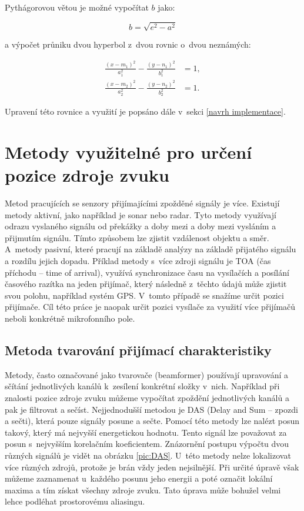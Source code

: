 Pythágorovou větou je možné vypočítat $b$ jako: 

\begin{equation}
    b = \sqrt{e^2 - a^2}
    \label{eq:vedlejsipoloosa}
\end{equation}

 a výpočet průniku dvou hyperbol z~dvou rovnic o~dvou neznámých:

\begin{align}
    \label{eq:prusecik}
    \frac{(x-m_{1})^2}{a_{1}^2}-\frac{(y-n_{1})^2}{b_{1}^2}&=1, \\
    \frac{(x-m_{2})^2}{a_{2}^2}-\frac{(y-n_{2})^2}{b_{2}^2}&=1.
\end{align}

Upravení této rovnice a využití je popsáno dále v~sekci \ref{navrh implementace}.

\chapter{Metody využitelné pro určení pozice zdroje zvuku}
\label{metody}

Metod pracujících se senzory přijímajícími zpožděné signály je více. Existují metody aktivní, jako například je sonar nebo radar. Tyto metody využívají odrazu vyslaného signálu od překážky a doby mezi a doby mezi vysláním a přijmutím signálu. Tímto způsobem lze zjistit vzdálenost objektu a směr. A~metody pasivní, které pracují na základě analýzy na základě přijatého signálu a rozdílu jejich dopadu. Příklad metody s~více zdroji signálu je TOA (čas příchodu – time of arrival), využívá synchronizace času na vysílačích a posílání časového razítka na jeden přijímač, který následně z~těchto údajů může zjistit svou polohu, například systém GPS. V~tomto případě se snažíme určit pozici přijímače. Cíl této práce je naopak určit pozici vysílače za využití více přijímačů neboli konkrétně mikrofonního pole.

\section{Metoda tvarování přijímací charakteristiky}
\label{beamforming}

Metody, často označované jako tvarovače (beamformer) používají upravování a sčítání jednotlivých kanálů k~zesílení konkrétní složky v~nich. Například při znalosti pozice zdroje zvuku můžeme vypočítat zpoždění jednotlivých kanálů a pak je filtrovat a sečíst. Nejjednodušší metodou je DAS (Delay and Sum – zpozdi a sečti), která pouze signály posune a sečte. Pomocí této metody lze nalézt posun takový, který má nejvyšší energetickou hodnotu. Tento signál lze považovat za posun s~nejvyšším korelačním koeficientem. Znázornění postupu výpočtu dvou různých signálů je vidět na obrázku \ref{pic:DAS}. U~této metody nelze lokalizovat více různých zdrojů, protože je brán vždy jeden nejsilnější. Při určité úpravě však můžeme zaznamenat u~každého posunu jeho energii a poté označit lokální maxima a tím získat všechny zdroje zvuku. Tato úprava může bohužel velmi lehce podléhat prostorovému aliasingu.


